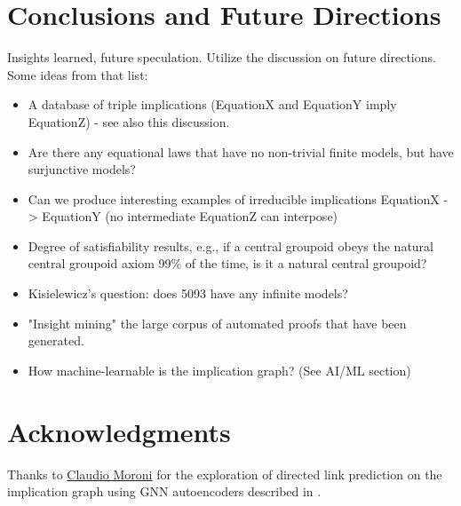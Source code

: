 \section{Conclusions and Future Directions}


Insights learned, future speculation. Utilize the discussion on future directions. Some ideas from that list:

\begin{itemize}
  \item A database of triple implications (EquationX and EquationY imply EquationZ) - see also this discussion.
  \item Are there any equational laws that have no non-trivial finite models, but have surjunctive models?
  \item Can we produce interesting examples of irreducible implications EquationX -> EquationY (no intermediate EquationZ can interpose)
  \item Degree of satisfiability results, e.g., if a central groupoid obeys the natural central groupoid axiom 99\% of the time, is it a natural central groupoid?
  \item Kisielewicz's question: does 5093 have any infinite models?
  \item "Insight mining" the large corpus of automated proofs that have been generated.
  \item How machine-learnable is the implication graph? (See AI/ML section)
\end{itemize}

\section*{Acknowledgments}

Thanks to \href{https://github.com/ClaudMor}{Claudio Moroni} for the exploration of directed link prediction
on the implication graph using GNN autoencoders described in .

